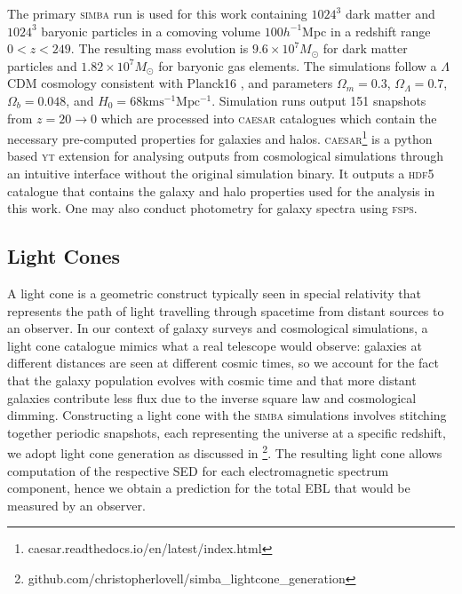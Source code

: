 \documentclass[
    a4paper, %
    10pt, %
    unnumberedsections, %
]{LTJournalArticle}
\begin{document}
The primary \textsc{simba} run is used for this work containing $1024^3$ dark matter and $1024^3$ baryonic particles in a comoving volume $100h^{-1}$Mpc in a redshift range $0<z<249$. The resulting mass evolution is $9.6 \times 10^7 M_\odot$ for dark matter particles and $1.82 \times 10^7 M_\odot$ for baryonic gas elements. The simulations follow a $\Lambda$CDM cosmology consistent with Planck16 \parencite{planckcollaborationPlanck2015Results2016}, and parameters $\Omega_m = 0.3$, $\Omega_\Lambda = 0.7$, $\Omega_b = 0.048$, and $H_0 = 68 \mathrm{kms^{-1}Mpc^{-1}}$. Simulation runs output 151 snapshots from $z=20 \rightarrow 0$ which are processed into \textsc{caesar} catalogues which contain the necessary pre-computed properties for galaxies and halos.\textsc{ caesar}\footnote{caesar.readthedocs.io/en/latest/index.html} is a python based \textsc{yt} extension for analysing outputs from cosmological simulations through an intuitive interface without the original simulation binary. It outputs a \textsc{hdf5} catalogue that contains the galaxy and halo properties used for the analysis in this work. One may also conduct photometry for galaxy spectra using \textsc{fsps}.

\subsection{Light Cones}
\label{subsec:lcConstruction}

A light cone is a geometric construct typically seen in special relativity that represents the path of light travelling through spacetime from distant sources to an observer. In our context of galaxy surveys and cosmological simulations, a light cone catalogue mimics what a real telescope would observe: galaxies at different distances are seen at different cosmic times, so we account for the fact that the galaxy population evolves with cosmic time and that more distant galaxies contribute less flux due to the inverse square law and cosmological dimming. Constructing a light cone with the \textsc{simba} simulations involves stitching together periodic snapshots, each representing the universe at a specific redshift, we adopt light cone generation as discussed in \cite{lovellReproducingSubmillimetreGalaxy2021}\footnote{github.com/christopherlovell/simba\_lightcone\_generation}. The resulting light cone allows computation of the respective SED for each electromagnetic spectrum component, hence we obtain a prediction for the total EBL that would be measured by an observer.
\end{document}
